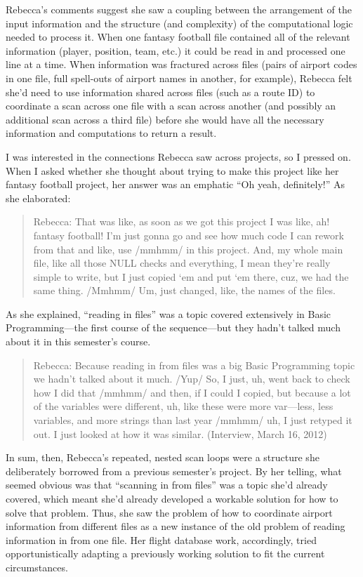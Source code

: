 Rebecca's comments suggest she saw a coupling between the arrangement of the input information and the structure (and complexity) of the computational logic needed to process it. When one fantasy football file contained all of the relevant information (player, position, team, etc.) it could be read in and processed one line at a time. When information was fractured across files (pairs of airport codes in one file, full spell-outs of airport names in another, for example), Rebecca felt she'd need to use information shared across files (such as a route ID) to coordinate a scan across one file with a scan across another (and possibly an additional scan across a third file) before she would have all the necessary information and computations to return a result.

I was interested in the connections Rebecca saw across projects, so I pressed on. When I asked whether she thought about trying to make this project like her fantasy football project, her answer was an emphatic ``Oh yeah, definitely!'' As she elaborated:

\begin{quote}
  Rebecca: That was like, as soon as we got this project I was like, ah! fantasy football! I'm just gonna go and see how much code I can rework from that and like, use /mmhmm/ in this project. And, my whole main file, like all those NULL checks and everything, I mean they're really simple to write, but I just copied `em and put `em there, cuz, we had the same thing. /Mmhmm/ Um, just changed, like, the names of the files.
\end{quote}

As she explained, ``reading in files'' was a topic covered extensively in Basic Programming---the first course of the sequence---but they hadn't talked much about it in this semester's course.

\begin{quote}
  Rebecca: Because reading in from files was a big Basic Programming topic we hadn't talked about it much. /Yup/ So, I just, uh, went back to check how I did that /mmhmm/ and then, if I could I copied, but because a lot of the variables were different, uh, like these were more var---less, less variables, and more strings than last year /mmhmm/ uh, I just retyped it out. I just looked at how it was similar. (Interview, March 16, 2012)
\end{quote}

In sum, then, Rebecca's repeated, nested scan loops were a structure she deliberately borrowed from a previous semester's project. By her telling, what seemed obvious was that ``scanning in from files'' was a topic she'd already covered, which meant she'd already developed a workable solution for how to solve that problem. Thus, she saw the problem of how to coordinate airport information from different files as a new instance of the old problem of reading information in from one file. Her flight database work, accordingly, tried opportunistically adapting a previously working solution to fit the current circumstances.

